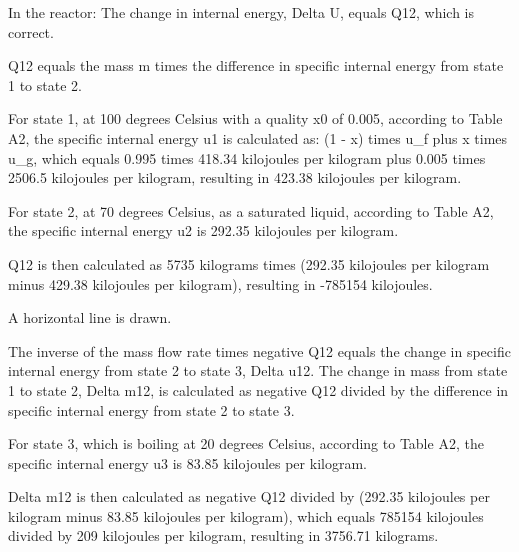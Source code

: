 In the reactor: The change in internal energy, Delta U, equals Q12, which is correct.

Q12 equals the mass m times the difference in specific internal energy from state 1 to state 2.

For state 1, at 100 degrees Celsius with a quality x0 of 0.005, according to Table A2, the specific internal energy u1 is calculated as:
(1 - x) times u_f plus x times u_g,
which equals 0.995 times 418.34 kilojoules per kilogram plus 0.005 times 2506.5 kilojoules per kilogram,
resulting in 423.38 kilojoules per kilogram.

For state 2, at 70 degrees Celsius, as a saturated liquid, according to Table A2, the specific internal energy u2 is 292.35 kilojoules per kilogram.

Q12 is then calculated as 5735 kilograms times (292.35 kilojoules per kilogram minus 429.38 kilojoules per kilogram),
resulting in -785154 kilojoules.

A horizontal line is drawn.

The inverse of the mass flow rate times negative Q12 equals the change in specific internal energy from state 2 to state 3, Delta u12.
The change in mass from state 1 to state 2, Delta m12, is calculated as negative Q12 divided by the difference in specific internal energy from state 2 to state 3.

For state 3, which is boiling at 20 degrees Celsius, according to Table A2, the specific internal energy u3 is 83.85 kilojoules per kilogram.

Delta m12 is then calculated as negative Q12 divided by (292.35 kilojoules per kilogram minus 83.85 kilojoules per kilogram), which equals 785154 kilojoules divided by 209 kilojoules per kilogram, resulting in 3756.71 kilograms.